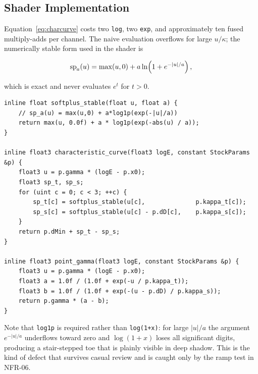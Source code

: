 \subsection{Shader Implementation}

Equation~\eqref{eq:charcurve} costs two \texttt{log}, two \texttt{exp}, and
approximately ten fused multiply-adds per channel. The naive evaluation
overflows for large $u/\kappa$; the numerically stable form used in the shader
is

\begin{equation}
\mathrm{sp}_{a}\!\left(u\right) = \max(u, 0) + a\ln\!\left(1 + e^{-|u|/a}\right),
\label{eq:softplus-stable}
\end{equation}

which is exact and never evaluates $e^{t}$ for $t > 0$.

\begin{lstlisting}[language=Metal, caption={Stable characteristic curve evaluation.}, label={lst:charcurve}]
inline float softplus_stable(float u, float a) {
    // sp_a(u) = max(u,0) + a*log1p(exp(-|u|/a))
    return max(u, 0.0f) + a * log1p(exp(-abs(u) / a));
}

inline float3 characteristic_curve(float3 logE, constant StockParams &p) {
    float3 u = p.gamma * (logE - p.x0);
    float3 sp_t, sp_s;
    for (uint c = 0; c < 3; ++c) {
        sp_t[c] = softplus_stable(u[c],              p.kappa_t[c]);
        sp_s[c] = softplus_stable(u[c] - p.dD[c],    p.kappa_s[c]);
    }
    return p.dMin + sp_t - sp_s;
}

inline float3 point_gamma(float3 logE, constant StockParams &p) {
    float3 u = p.gamma * (logE - p.x0);
    float3 a = 1.0f / (1.0f + exp(-u / p.kappa_t));
    float3 b = 1.0f / (1.0f + exp(-(u - p.dD) / p.kappa_s));
    return p.gamma * (a - b);
}
\end{lstlisting}

Note that \texttt{log1p} is required rather than \texttt{log(1+x)}: for large
$|u|/a$ the argument $e^{-|u|/a}$ underflows toward zero and $\log(1+x)$ loses
all significant digits, producing a stair-stepped toe that is plainly visible in
deep shadow. This is the kind of defect that survives casual review and is
caught only by the ramp test in NFR-06.
